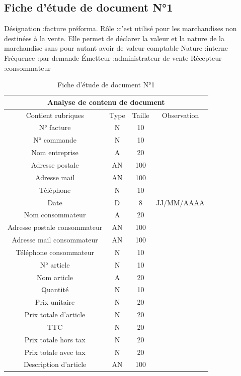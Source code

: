 \documentclass[edit,12pt,a4paper,ChapStyle,oneside,doubleinterligne]{report}
\begin{document}
\subsection{Fiche d’étude de document N°1}
Désignation :facture préforma.
\newline Rôle :c’est utilisé pour les marchandises non destinées à la vente. Elle permet de déclarer la valeur et la nature de la marchandise sans pour autant avoir de valeur comptable
\newline Nature :interne
\newline Fréquence :par demande
\newline Émetteur :administrateur de vente
\newline Récepteur :consommateur \cite{Facturep}
\begin{table}[h!]
    \centering
    \begin{tabular}{|c|c|c|c|}
         \hline
\multicolumn{4}{|c|}{Analyse de contenu de document}\\
\hline
Contient rubriques & Type & Taille & Observation\\
\hline
 N° facture  & N & 10 & \\
 N° commande  & N & 10 & \\
 Nom entreprise & A & 20 & \\
 Adresse postale & AN & 100 & \\
 Adresse mail & AN & 100 & \\
 Téléphone & N & 10 & \\
Date & D & 8 & JJ/MM/AAAA \\
Nom consommateur & A & 20 & \\
Adresse postale consommateur & AN & 100 & \\
Adresse mail consommateur & AN & 100 & \\
Téléphone consommateur & N & 10 & \\
N° article & N & 10 & \\
Nom article & A & 20 & \\
Quantité & N & 10 & \\
Prix unitaire & N & 20 & \\
Prix totale d’article & N & 20 & \\
TTC & N & 20 & \\
Prix totale hors tax & N & 20 & \\
Prix totale avec tax & N & 20 & \\
Description d’article & AN & 100 & \\
\hline
    \end{tabular}
    \caption{Fiche d’étude de document N°1}
    \label{tab:1}
\end{table}
\newpage
\end{document}
